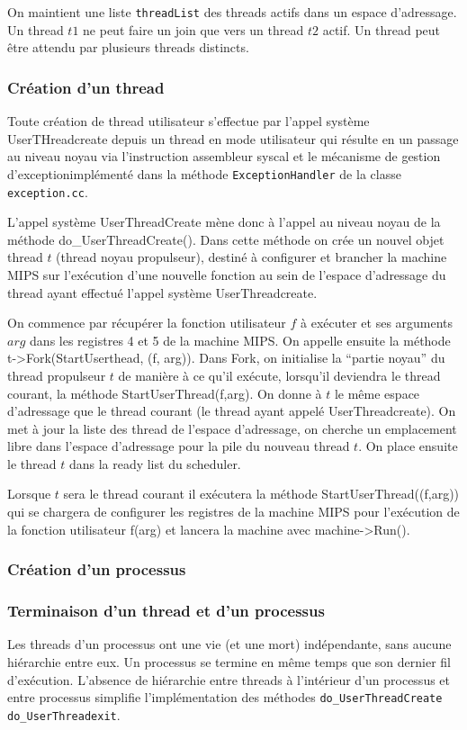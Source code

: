 \documentclass[11pt]{article}
\begin{document}
On maintient une liste \texttt{threadList} des threads actifs dans un espace d'adressage.
Un thread $t1$ ne peut faire un join que vers un thread $t2$ actif.
Un thread peut être attendu par plusieurs threads distincts.

\subsubsection{Création d'un thread}
Toute création de thread utilisateur s'effectue par l'appel système UserTHreadcreate
depuis un thread en mode utilisateur qui résulte en un passage au niveau noyau
via l'instruction assembleur syscal et le mécanisme de gestion d'exceptionimplémenté dans la méthode \texttt{ExceptionHandler} de la classe  \texttt{exception.cc}.

L'appel système UserThreadCreate mène donc à l'appel au niveau noyau de la méthode do\_UserThreadCreate(). Dans cette méthode on crée un nouvel objet thread $t$ (thread noyau propulseur), destiné à configurer et brancher la machine MIPS sur l'exécution d'une nouvelle fonction au sein de l'espace d'adressage du thread ayant effectué l'appel système UserThreadcreate.

On commence par récupérer la fonction utilisateur $f$ à exécuter et ses arguments $arg$ dans les registres 4 et 5 de la machine MIPS.
On appelle ensuite la méthode t->Fork(StartUserthead, (f, arg)).
Dans Fork, on initialise la ``partie noyau'' du thread propulseur $t$ de manière
à ce qu'il exécute, lorsqu'il deviendra le thread courant, la méthode
StartUserThread(f,arg). On donne à $t$ le même espace d'adressage que le
thread courant (le thread ayant appelé UserThreadcreate). On met à jour
la liste des thread de l'espace d'adressage, on cherche un emplacement
libre dans l'espace d'adressage pour la pile du nouveau thread $t$.
On place ensuite le thread $t$ dans la ready list du scheduler.

Lorsque $t$ sera le thread courant il exécutera la méthode StartUserThread((f,arg))
qui se chargera de configurer les registres de la machine MIPS pour l'exécution
de la fonction utilisateur f(arg) et lancera la machine avec machine->Run(). 

\subsubsection{Création d'un processus}

\subsubsection{Terminaison d'un thread et d'un processus}
Les threads d'un processus ont une vie (et une mort) indépendante, sans aucune hiérarchie entre eux.
Un processus se termine en même temps que son dernier fil d'exécution.
L'absence de hiérarchie entre threads à l'intérieur d'un processus et entre processus simplifie
l'implémentation des méthodes \texttt{do\_UserThreadCreate} \texttt{do\_UserThreadexit}.
\end{document}
